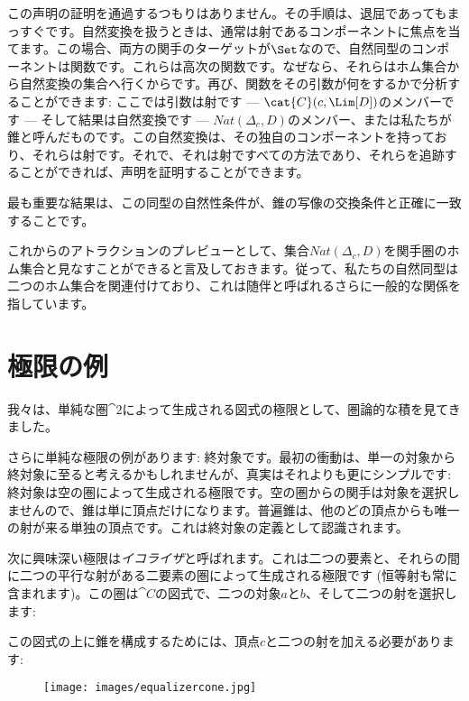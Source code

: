 この声明の証明を通過するつもりはありません。その手順は、退屈であってもまっすぐです。自然変換を扱うときは、通常は射であるコンポーネントに焦点を当てます。この場合、両方の関手のターゲットが$\Set$なので、自然同型のコンポーネントは関数です。これらは高次の関数です。なぜなら、それらはホム集合から自然変換の集合へ行くからです。再び、関数をその引数が何をするかで分析することができます: ここでは引数は射です --- $\cat{C}(c, \Lim[D])$のメンバーです --- そして結果は自然変換です --- $\mathit{Nat}(\Delta_c, D)$のメンバー、または私たちが錐と呼んだものです。この自然変換は、その独自のコンポーネントを持っており、それらは射です。それで、それは射ですべての方法であり、それらを追跡することができれば、声明を証明することができます。

最も重要な結果は、この同型の自然性条件が、錐の写像の交換条件と正確に一致することです。

これからのアトラクションのプレビューとして、集合$\mathit{Nat}(\Delta_c, D)$を関手圏のホム集合と見なすことができると言及しておきます。従って、私たちの自然同型は二つのホム集合を関連付けており、これは随伴と呼ばれるさらに一般的な関係を指しています。

\section{極限の例}

我々は、単純な圏$\cat{2}$によって生成される図式の極限として、圏論的な積を見てきました。

さらに単純な極限の例があります: 終対象です。最初の衝動は、単一の対象から終対象に至ると考えるかもしれませんが、真実はそれよりも更にシンプルです: 終対象は空の圏によって生成される極限です。空の圏からの関手は対象を選択しませんので、錐は単に頂点だけになります。普遍錐は、他のどの頂点からも唯一の射が来る単独の頂点です。これは終対象の定義として認識されます。

次に興味深い極限は\emph{イコライザ}と呼ばれます。これは二つの要素と、それらの間に二つの平行な射がある二要素の圏によって生成される極限です (恒等射も常に含まれます)。この圏は$\cat{C}$の図式で、二つの対象$a$と$b$、そして二つの射を選択します: 


この図式の上に錐を構成するためには、頂点$c$と二つの射を加える必要があります: 


\begin{figure}[H]
  \centering
  \texttt{[image: images/equalizercone.jpg]}
\end{figure}

